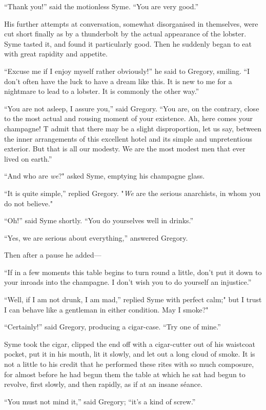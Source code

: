 \documentclass{book}
\begin{document}
“Thank you!” said the motionless Syme. “You are very good.”

His further attempts at conversation, somewhat disorganised in themselves, were cut short finally as by a thunderbolt by the actual appearance of the lobster. Syme tasted it, and found it particularly good. Then he suddenly began to eat with great rapidity and appetite.

“Excuse me if I enjoy myself rather obviously!” he said to Gregory, smiling. “I don’t often have the luck to have a dream like this. It is new to me for a nightmare to lead to a lobster. It is commonly the other way.”

“You are not asleep, I assure you,” said Gregory. “You are, on the contrary, close to the most actual and rousing moment of your existence. Ah, here comes your champagne! T admit that there may be a slight disproportion, let us say, between the inner arrangements of this excellent hotel and its simple and unpretentious exterior. But that is all our modesty. We are the most modest men that ever lived on earth.”

“And who are \emph{we}?" asked Syme, emptying his champagne glass.

“It is quite simple,” replied Gregory. "\emph{We} are the serious anarchists, in whom you do not believe."

“Oh!” said Syme shortly. “You do yourselves well in drinks.”

“Yes, we are serious about everything,” answered Gregory.

Then after a pause he added—

“If in a few moments this table begins to turn round a little, don’t put it down to your inroads into the champagne. I don’t wish you to do yourself an injustice.”

“Well, if I am not drunk, I am mad,” replied Syme with perfect calm;" but I trust I can behave like a gentleman in either condition. May I smoke?"

“Certainly!” said Gregory, producing a cigar-case. “Try one of mine.”

Syme took the cigar, clipped the end off with a cigar-cutter out of his waistcoat pocket, put it in his mouth, lit it slowly, and let out a long cloud of smoke. It is not a little to his credit that he performed these rites with so much composure, for almost before he had begun them the table at which he sat had begun to revolve, first slowly, and then rapidly, as if at an insane séance.

“You must not mind it,” said Gregory; “it’s a kind of screw.”
\end{document}
